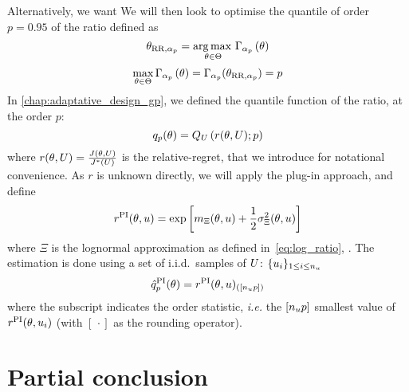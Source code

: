 \documentclass[../../Main_ManuscritThese.tex]{subfiles}
\newcommand\imgpath{/home/victor/acadwriting/Manuscrit/Text/Chapter5/img/}
\begin{document}
Alternatively, we want 
We will then look to optimise the quantile of order $p=0.95$ of the ratio defined as
\begin{equation}
  {\theta}_{\mathrm{RR},\alpha_p} = \operatorname*{arg\,max \,}_{\theta \in \Theta} \Gamma_{\alpha_p}\left(\theta\right)
\end{equation}
\begin{equation}
\max_{\theta\in\Theta}  \Gamma_{\alpha_p}\left(\theta\right) = \Gamma_{\alpha_p}(\theta_{\mathrm{RR}, \alpha_p}) = p
\end{equation}
In \cref{chap:adaptative_design_gp}, we defined the quantile function of the ratio, at the order $p$:
\begin{equation}
  q_p(\theta) = Q_{U}\left(r(\theta, U);p \right)
\end{equation}
where $r(\theta, U)=\frac{J(\theta, U)}{J^*(U)}$ is the
relative-regret, that we introduce for notational convenience.
As $r$ is unknown directly, we will apply the plug-in approach, and define
\begin{equation}
  r^{\mathrm{PI}}(\theta, u) = \exp\left[m_{\Xi}(\theta, u) + \frac{1}{2}\sigma^2_{\Xi}(\theta, u)\right]
\end{equation}
where $\Xi$ is the lognormal approximation as defined in~\cref{eq:log_ratio}, . The estimation is done using a set of i.i.d.\ samples of $U$: $\{u_i\}_{1\leq i \leq n_{u}}$
\begin{equation}
  \hat{q}_p^{\mathrm{PI}}(\theta) = {r}^{\mathrm{PI}}(\theta, u)_{(\left[n_{u}p\right])}
\end{equation}
where the subscript indicates the order statistic, \emph{i.e.} the $\left[n_{u}p\right]$ smallest value of $r^\mathrm{PI}(\theta,u_i)$ (with $[\,\cdot]$ as the rounding operator).

\section{Partial conclusion}

%   

%   


\vfill
\etoile
\vfill




\subfileLocal{
	\pagestyle{empty}
	
	
}
\end{document}
